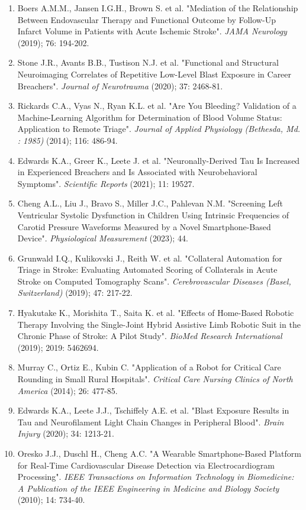 {{\begin{enumerate}
    \item Boers A.M.M., Jansen I.G.H., Brown S. et al. "Mediation of the Relationship Between Endovascular Therapy and Functional Outcome by Follow-Up Infarct Volume in Patients with Acute Ischemic Stroke". \textit{JAMA Neurology} (2019); 76: 194-202.
    \item Stone J.R., Avants B.B., Tustison N.J. et al. "Functional and Structural Neuroimaging Correlates of Repetitive Low-Level Blast Exposure in Career Breachers". \textit{Journal of Neurotrauma} (2020); 37: 2468-81.
    \item Rickards C.A., Vyas N., Ryan K.L. et al. "Are You Bleeding? Validation of a Machine-Learning Algorithm for Determination of Blood Volume Status: Application to Remote Triage". \textit{Journal of Applied Physiology (Bethesda, Md. : 1985)} (2014); 116: 486-94.
    \item Edwards K.A., Greer K., Leete J. et al. "Neuronally-Derived Tau Is Increased in Experienced Breachers and Is Associated with Neurobehavioral Symptoms". \textit{Scientific Reports} (2021); 11: 19527.
    \item Cheng A.L., Liu J., Bravo S., Miller J.C., Pahlevan N.M. "Screening Left Ventricular Systolic Dysfunction in Children Using Intrinsic Frequencies of Carotid Pressure Waveforms Measured by a Novel Smartphone-Based Device". \textit{Physiological Measurement} (2023); 44.
    \item Grunwald I.Q., Kulikovski J., Reith W. et al. "Collateral Automation for Triage in Stroke: Evaluating Automated Scoring of Collaterals in Acute Stroke on Computed Tomography Scans". \textit{Cerebrovascular Diseases (Basel, Switzerland)} (2019); 47: 217-22.
    \item Hyakutake K., Morishita T., Saita K. et al. "Effects of Home-Based Robotic Therapy Involving the Single-Joint Hybrid Assistive Limb Robotic Suit in the Chronic Phase of Stroke: A Pilot Study". \textit{BioMed Research International} (2019); 2019: 5462694.
    \item Murray C., Ortiz E., Kubin C. "Application of a Robot for Critical Care Rounding in Small Rural Hospitals". \textit{Critical Care Nursing Clinics of North America} (2014); 26: 477-85.
    \item Edwards K.A., Leete J.J., Tschiffely A.E. et al. "Blast Exposure Results in Tau and Neurofilament Light Chain Changes in Peripheral Blood". \textit{Brain Injury} (2020); 34: 1213-21.
    \item Oresko J.J., Duschl H., Cheng A.C. "A Wearable Smartphone-Based Platform for Real-Time Cardiovascular Disease Detection via Electrocardiogram Processing". \textit{IEEE Transactions on Information Technology in Biomedicine: A Publication of the IEEE Engineering in Medicine and Biology Society} (2010); 14: 734-40.

\end{enumerate}}}
